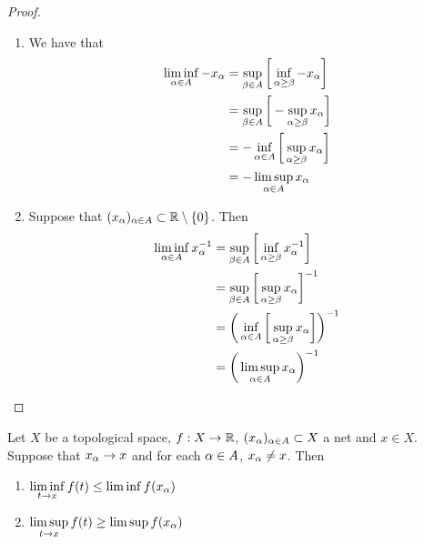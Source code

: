 \documentclass{book}
\begin{document}
	\begin{proof}\
		\begin{enumerate}
			\item We have that
			\begin{align*}
				\liminf_{\alpha \in A} - x_{\alpha}
				& = \sup_{\beta \in A} \bigg[ \inf_{\alpha \geq \beta} - x_{\alpha} \bigg] \\
				& =  \sup_{\beta \in A} \bigg[ - \sup_{\alpha \geq \beta}  x_{\alpha} \bigg] \\
				& = - \inf_{\alpha \in A } \bigg[ \sup_{\alpha \geq \beta} x_{\alpha} \bigg] \\
				& = - \limsup_{\alpha \in A} x_{\alpha}
			\end{align*}
			\item Suppose that $(x_{\alpha})_{\alpha \in A} \subset \mathbb{R} \setminus \{0\}$. Then 
			\begin{align*}
				\liminf_{\alpha \in A}  x_{\alpha}^{-1}
				& = \sup_{\beta \in A} \bigg[ \inf_{\alpha \geq \beta}  x_{\alpha}^{-1} \bigg] \\
				& =  \sup_{\beta \in A} \bigg[ \sup_{\alpha \geq \beta}  x_{\alpha} \bigg]^{-1} \\
				& =  \bigg( \inf_{\alpha \in A } \bigg[ \sup_{\alpha \geq \beta}  x_{\alpha} \bigg] \bigg)^{-1} \\
				& =  \bigg( \limsup_{\alpha \in A} x_{\alpha} \bigg)^{-1}
			\end{align*}
		\end{enumerate}
	\end{proof}
	

	\begin{ex}
		Let $X$ be a topological space, $f:X \rightarrow \mathbb{R}$, $(x_{\alpha})_{\alpha \in A} \subset X$ a net and $x \in X$. Suppose that $x_{\alpha} \rightarrow x$ and for each $\alpha \in A$, $x_{\alpha} \neq x$. Then 
		\begin{enumerate}
			\item $\liminf\limits_{t \rightarrow x} f(t) \leq \liminf f(x_{\alpha})$
			\item $\limsup\limits_{t \rightarrow x} f(t) \geq \limsup f(x_{\alpha})$
		\end{enumerate}
	\end{ex}
\end{document}
